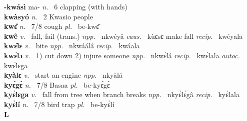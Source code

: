 {\bfseries -kwásì} ma- {\itshape n.~} 6 clapping (with hands)    \\ 
{\bfseries kwàsyó}  {\itshape n.~} 2 Kwasio people    \\ 
{\bfseries kwɛ̂}  {\itshape n.~} 7/8 cough {\itshape pl.~} be-kwɛ̂    \\ 
{\bfseries kwê}  {\itshape v.~} fall, fail (trans.)   {\itshape npp.~} nkwéyâ {\itshape caus.~} kùɛsɛ make fall {\itshape recip.~} kwéyala  \\ 
{\bfseries kwɛ̂lɛ}  {\itshape v.~} bite   {\itshape npp.~} nkwáálâ {\itshape recip.~} kwáala  \\ 
{\bfseries kwɛ̀lɔ}  {\itshape v.~} 1) cut down 2) injure someone   {\itshape npp.~} nkwɛ̀lá {\itshape recip.~} kwɛ̀lala {\itshape autoc.~} kwɛ̀lɛga  \\ 
{\bfseries kyàlɛ}  {\itshape v.~} start an engine   {\itshape npp.~} nkyàlá  \\ 
{\bfseries kyɛ́gɛ̀}  {\itshape n.~} 7/8 Basaa {\itshape pl.~} be-kyɛ́gɛ̀    \\ 
{\bfseries kyɛ̀lɛga}  {\itshape v.~} fall from tree when branch breaks   {\itshape npp.~} nkyɛ̀lɛ́gâ {\itshape recip.~} kyɛ̀lala  \\ 
{\bfseries kyɛ̀lí}  {\itshape n.~} 7/8 bird trap {\itshape pl.~} be-kyɛ̀lí    \\ 

\medskip
\noindent \large {\bfseries L}\normalsize\\
\medskip

